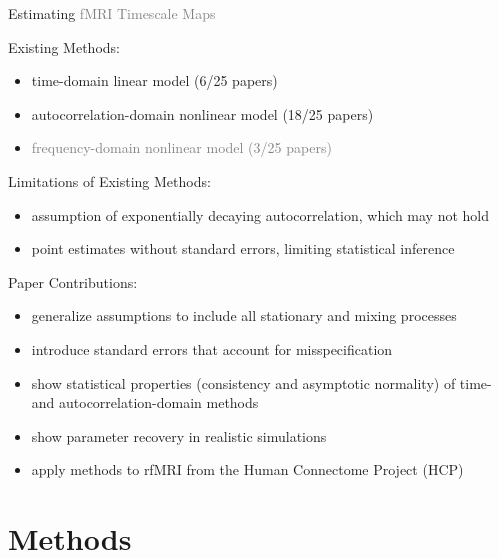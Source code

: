 \documentclass[8pt,aspectratio=169]{beamer}
\begin{document}
\begin{frame}{Estimating \textcolor{gray}{fMRI Timescale Maps}}

Existing Methods:
\begin{itemize}
    \item time-domain linear model (6/25 papers)
    \item autocorrelation-domain nonlinear model (18/25 papers)
    \item \textcolor{gray}{frequency-domain nonlinear model (3/25 papers)}
\end{itemize}

\vfill
Limitations of Existing Methods:
\begin{itemize}
    \item assumption of exponentially decaying autocorrelation, which may not hold
    \item point estimates without standard errors, limiting statistical inference
\end{itemize}

\vfill
Paper Contributions:
\begin{itemize}
    \item generalize assumptions to include all stationary and mixing processes
    \item introduce standard errors that account for misspecification
    \item show statistical properties (consistency and asymptotic normality) of time- and autocorrelation-domain methods
    \item show parameter recovery in realistic simulations
    \item apply methods to rfMRI from the Human Connectome Project (HCP)
\end{itemize}

\end{frame}


\section{Methods}
\end{document}

